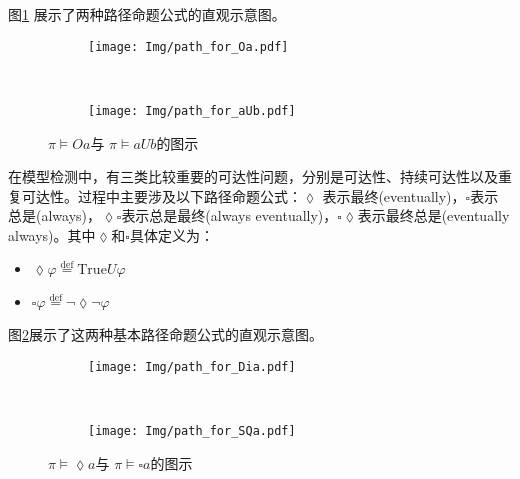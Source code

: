 图\ref{fig:path-formula-basic} 展示了两种路径命题公式的直观示意图。


\begin{figure}[!htbp]
    \centering
    \begin{subfigure}[b]{0.8\textwidth}
        \centering
        \texttt{[image: Img/path\_for\_Oa.pdf]}
    \end{subfigure}
    \\
    \begin{subfigure}{0.8\textwidth}
        \centering
        \texttt{[image: Img/path\_for\_aUb.pdf]}
    \end{subfigure}
    \caption{$\pi\models O a $与 $\pi\models a U b$的图示}
    \label{fig:path-formula-basic}
\end{figure}
在模型检测中，有三类比较重要的可达性问题，分别是可达性、持续可达性以及重复可达性。过程中主要涉及以下路径命题公式：\(\lozenge\) 表示最终(eventually)，\(\square\)表示总是(always)，\(\lozenge\square\)表示总是最终(always eventually)，\(\square\lozenge\)表示最终总是(eventually always)。其中\(\lozenge\)和\(\square\)具体定义为：
\begin{itemize}
    \item \(\lozenge\varphi\overset{\text{def} }{=} \text{True}U\varphi\)
    \item \(\square\varphi\overset{\text{def} }{=} \neg\lozenge\neg\varphi\)
\end{itemize}
图\ref{fig:path-formula}展示了这两种基本路径命题公式的直观示意图。
\begin{figure}[!htbp]
    \centering
    \begin{subfigure}[b]{0.8\textwidth}
        \centering
        \texttt{[image: Img/path\_for\_Dia.pdf]}
    \end{subfigure}
    \\
    \begin{subfigure}{0.8\textwidth}
        \centering
        \texttt{[image: Img/path\_for\_SQa.pdf]}
    \end{subfigure}
    \caption{$\pi\models\lozenge a$与 $\pi\models\square a$的图示}
    \label{fig:path-formula}
\end{figure}

